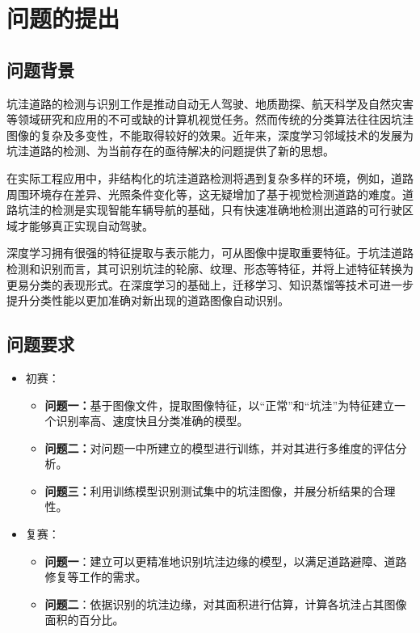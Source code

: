 \documentclass{MathorCupmodeling}
\begin{document}
	\pagestyle{empty}
	\tableofcontents
	\newpage
	\pagestyle{fancy}

	\setcounter{page}{1}
	\section{问题的提出}
	\subsection{问题背景}
	坑洼道路的检测与识别工作是推动自动无人驾驶、地质勘探、航天科学及自然灾害等领域研究和应用的不可或缺的计算机视觉任务。然而传统的分类算法往往因坑洼图像的复杂及多变性，不能取得较好的效果。近年来，深度学习邻域技术的发展为坑洼道路的检测、为当前存在的亟待解决的问题提供了新的思想。

	在实际工程应用中，非结构化的坑洼道路检测将遇到复杂多样的环境，例如，道路周围环境存在差异、光照条件变化等，这无疑增加了基于视觉检测道路的难度\textcolor{blue}{\cite{曹江华}}。道路坑洼的检测是实现智能车辆导航的基础，只有快速准确地检测出道路的可行驶区域才能够真正实现自动驾驶。

	深度学习拥有很强的特征提取与表示能力，可从图像中提取重要特征。于坑洼道路检测和识别而言，其可识别坑洼的轮廓、纹理、形态等特征，并将上述特征转换为更易分类的表现形式。在深度学习的基础上，迁移学习、知识蒸馏等技术可进一步提升分类性能以更加准确对新出现的道路图像自动识别。
	\subsection{问题要求}
	\begin{itemize}
		\item {\heiti 初赛：}
		\begin{itemize}
			\item \textbf{问题一：}基于图像文件，提取图像特征，以“正常”和“坑洼”为特征建立一个识别率高、速度快且分类准确的模型。
			\item \textbf{问题二：}对问题一中所建立的模型进行训练，并对其进行多维度的评估分析。
			\item \textbf{问题三：}利用训练模型识别测试集中的坑洼图像，并展分析结果的合理性。
		\end{itemize}
		\item {\heiti 复赛：}
		\begin{itemize}
			\item \textbf{问题一}：建立可以更精准地识别坑洼边缘的模型，以满足道路避障、道路修复等工作的需求。
			\item \textbf{问题二}：依据识别的坑洼边缘，对其面积进行估算，计算各坑洼占其图像面积的百分比。
		\end{itemize}
	\end{itemize}
\end{document}
